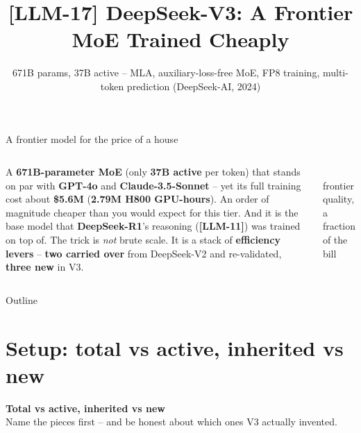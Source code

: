 \documentclass[aspectratio=169]{beamer}
\title{[LLM-17] DeepSeek-V3: A Frontier MoE Trained Cheaply}
\subtitle{671B params, 37B active -- MLA, auxiliary-loss-free MoE, FP8 training, multi-token prediction \quad(DeepSeek-AI, 2024)}
\date{}
\begin{document}
\begin{frame}{A frontier model for the price of a house}
  \begin{columns}[T]
    A \textbf{671B-parameter MoE} (only \textbf{37B active} per token) that stands on
    par with \textbf{GPT-4o} and \textbf{Claude-3.5-Sonnet} -- yet its full training cost
    about \textbf{\$5.6M} (\textbf{2.79M H800 GPU-hours}). An order of magnitude cheaper
    than you would expect for this tier.
    \vskip 6pt
    And it is the base model that \textbf{DeepSeek-R1}'s reasoning (\textbf{[LLM-11]}) was
    trained on top of.
    \vskip 6pt
    The trick is \emph{not} brute scale. It is a stack of \textbf{efficiency levers} --
    \textbf{two carried over} from DeepSeek-V2 and re-validated, \textbf{three new} in V3.
    \begin{center}
      \\[4pt]
      {\scriptsize frontier quality, a fraction of the bill}
    \end{center}
  \end{columns}
\end{frame}

\begin{frame}{Outline}
  \tableofcontents
\end{frame}

\section{Setup: total vs active, inherited vs new}

\begin{frame}[plain]
  \vfill
  \begin{center}
    {\color{popblue}\Large\bfseries Total vs active, inherited vs new}\\[4pt]
    \small Name the pieces first -- and be honest about which ones V3 actually invented.
  \end{center}
  \vfill
\end{frame}
\end{document}
